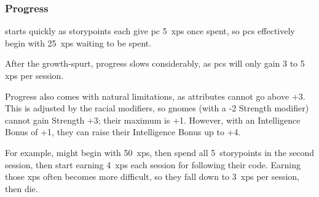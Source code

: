 \begin{multicols}{2}
\subsubsection{Progress}
starts quickly as \glspl{storypoint} each give \gls{pc} 5~\glspl{xp} once spent, so \glspl{pc} effectively begin with 25~\glspl{xp} waiting to be spent.


After the growth-spurt, progress slows considerably, as \glspl{pc} will only gain 3 to 5 \glspl{xp} per session.

\label{racial_limits}

Progress also comes with natural limitations, as \glspl{attribute} cannot go above +3.
This is adjusted by the racial modifiers, so gnomes (with a -2 Strength modifier) cannot gain Strength +3; their maximum is +1.
However, with an Intelligence Bonus of +1, they can raise their Intelligence Bonus up to +4.

For example,  might begin with 50~\glspl{xp}, then spend all 5~\glspl{storypoint} in the second session, then start earning 4~\glspl{xp} each session for following their code.
Earning those \glspl{xp} often becomes more difficult, so they fall down to 3~\glspl{xp} per session, then die.

\newcommand\describeFullCycle{%
  \showCycle~\arabic{fenestraDay}%
  \ifnum\value{fenestraDay}<26%
    ~(\showTemperature)%
  \fi%
}

\setcounter{xp}{0}
\newcommand\runningXPtotal[1]{%
  \addtocounter{xp}{#1}%
  \setcounter{fp}{\value{xp}}%
  \divide\value{fp} by 10%
  \addtocounter{fp}{0}%
  \arabic{xp}
}

\setcounter{r12}{\month}
\setcounter{track}{\day}
\addtocounter{track}{20}

\newcommand\realMonth[1][7]{%
  \addtocounter{track}{#1}%
  \ifnum\value{track}>30%
    \addtocounter{track}{-30}%
    \stepcounter{r12}%
  \fi%
  \trackMonth[r12]~\arabic{track}%
  \setCycle{\value{r12}}{\value{track}}%
}


\end{multicols}
